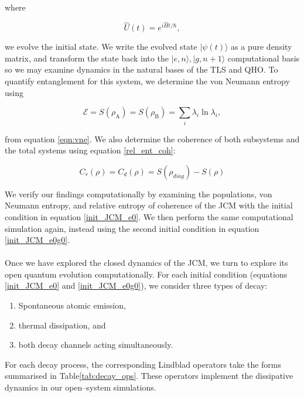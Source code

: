 \documentclass[11pt]{article}
\begin{document}
where 

\begin{equation*}
    \hat{U}(t) = e^{i\hat{H}t/\hbar},
\end{equation*}

we evolve the initial state. We write the evolved state $|\psi(t)\rangle$ as a pure density matrix, and transform the state back into the $|e, n\rangle, |g,n+1\rangle$ computational basis so we may examine dynamics in the natural bases of the TLS and QHO. To quantify entanglement for this system, we determine the von Neumann entropy using

\begin{equation*}
    \mathcal{E} = S(\rho_{\scriptscriptstyle \text{A}}) = S(\rho_{\scriptscriptstyle \text{B}}) = \sum_i \lambda_i\ln\lambda_i,
\end{equation*}

from equation \eqref{eqn:vne}. We also determine the coherence of both subsystems and the total systems using equation \eqref{rel_ent_coh}:

\begin{equation*} 
C_r(\rho) = C_d(\rho) = S(\rho_{diag}) - S(\rho)
\end{equation*}

We verify our findings computationally by examining the populations, von Neumann entropy, and relative entropy of coherence of the JCM with the initial condition in equation \eqref{init_JCM_e0}. We then perform the same computational simulation again, instead using the second initial condition in equation \eqref{init_JCM_e0g0}. \\
\\
Once we have explored the closed dynamics of the JCM, we turn to explore its open quantum evolution computationally. For each initial condition (equations \eqref{init_JCM_e0} and \eqref{init_JCM_e0g0}), we consider three types of decay:

\begin{enumerate}
    \item Spontaneous atomic emission, 
    \item thermal dissipation, and
    \item both decay channels acting simultaneously.\\
\end{enumerate}

For each decay process, the corresponding Lindblad operators take the forms summarised in Table\ref{tab:decay_ops}. These operators implement the dissipative dynamics in our open--system simulations. 
\end{document}
